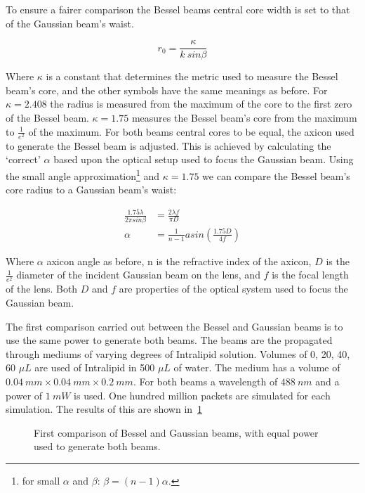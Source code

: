 To ensure a fairer comparison the Bessel beams central core width is set to that of the Gaussian beam's waist.

\begin{equation}
r_0=\frac{\kappa}{k\ sin\beta}  
\end{equation}

Where $\kappa$ is a constant that determines the metric used to measure the Bessel beam's core, and the other symbols have the same meanings as before.
For $\kappa=2.408$ the radius is measured from the maximum of the core to the first zero of the Bessel beam.
$\kappa=1.75$ measures the Bessel beam's core from the maximum to $\tfrac{1}{e^2}$ of the maximum.
For both beams central cores to be equal, the axicon used to generate the Bessel beam is adjusted.
This is achieved by calculating the `correct' $\alpha$ based upon the optical setup used to focus the Gaussian beam. 
Using the small angle approximation\footnote{for small $\alpha$ and $\beta$: $\beta=(n-1)\alpha$.} and $\kappa=1.75$ we can compare the Bessel beam's core radius to a Gaussian beam's waist:

\begin{align}
\frac{1.75\lambda}{2\pi sin\beta}&=\frac{2\lambda f}{\pi D} \\
\alpha &= \frac{1}{n-1}asin\left(\frac{1.75 D}{4 f}\right)
\end{align}

Where $\alpha$ axicon angle as before, n is the refractive index of the axicon, $D$ is the $\tfrac{1}{e^2}$ diameter of the incident Gaussian beam on the lens, and $f$ is the focal length of the lens.
Both $D$ and $f$ are properties of the optical system used to focus the Gaussian beam.

The first comparison carried out between the Bessel and Gaussian beams is to use the same power to generate both beams.
The beams are the propagated through mediums of varying degrees of Intralipid solution.
Volumes of 0, 20, 40, 60 $\mu L$ are used of Intralipid in 500 $\mu L$ of water.
The medium has a volume of $0.04~mm \times 0.04~mm \times 0.2~mm$.%
For both beams a wavelength of $488~nm$ and a power of $1~mW$ is used.
One hundred million packets are simulated for each simulation.
The results of this are shown in~\cref{fig:1stcomp}

\begin{figure}[!ht]
    \centering
    \caption{First comparison of Bessel and Gaussian beams, with equal power used to generate both beams.}
    \label{fig:1stcomp}
\end{figure}

